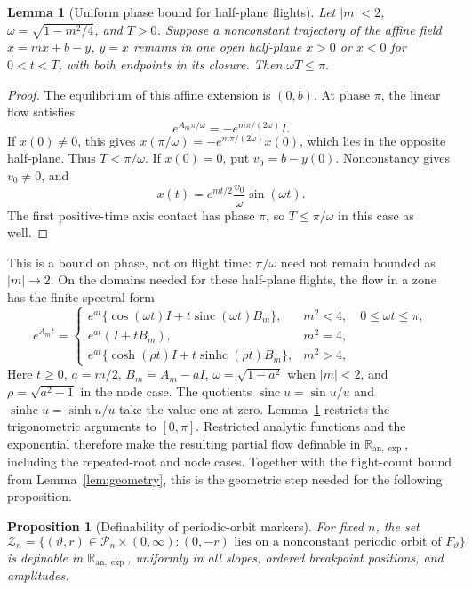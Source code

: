 \documentclass[11pt]{article}
\newtheorem{proposition}[theorem]{Proposition}
\newtheorem{lemma}[theorem]{Lemma}
\theoremstyle{remark}
\newcommand{\Ranexp}{\mathbb R_{\mathrm{an},\exp}}
\newcommand{\sinc}{\operatorname{sinc}}
\newcommand{\sinhc}{\operatorname{sinhc}}
\begin{document}
\begin{lemma}[Uniform phase bound for half-plane flights]
\label{lem:phase-bound}
Let \(|m|<2\), \(\omega=\sqrt{1-m^2/4}\), and \(T>0\).
Suppose a nonconstant trajectory of the affine field
\(\dot x=mx+b-y\), \(\dot y=x\) remains in one open half-plane
\(x>0\) or \(x<0\) for \(0<t<T\), with both endpoints in its
closure.  Then \(\omega T\le\pi\).
\end{lemma}
\begin{proof}
The equilibrium of this affine extension is \((0,b)\).  At phase
\(\pi\), the linear flow satisfies
\[
 e^{A_m\pi/\omega}=-e^{m\pi/(2\omega)}I.
\]
If \(x(0)\ne0\), this gives
\(x(\pi/\omega)=-e^{m\pi/(2\omega)}x(0)\), which lies in the
opposite half-plane.  Thus \(T<\pi/\omega\).  If \(x(0)=0\), put
\(v_0=b-y(0)\).  Nonconstancy gives \(v_0\ne0\), and
\[
 x(t)=e^{mt/2}\frac{v_0}{\omega}\sin(\omega t).
\]
The first positive-time axis contact has phase \(\pi\), so
\(T\le\pi/\omega\) in this case as well.
\end{proof}

This is a bound on phase, not on flight time: \(\pi/\omega\) need
not remain bounded as \(|m|\to2\).  On the domains needed for these
half-plane flights, the flow in a zone has the finite spectral form
\begin{equation}\label{eq:all-flows}
e^{A_mt}=\begin{cases}
e^{at}\{\cos(\omega t)I+t\sinc(\omega t)B_m\},&m^2<4,\quad0\le\omega t\le\pi,\\
e^{at}(I+tB_m),&m^2=4,\\
e^{at}\{\cosh(\rho t)I+t\sinhc(\rho t)B_m\},&m^2>4,
\end{cases}
\end{equation}
Here \(t\ge0\), \(a=m/2\), \(B_m=A_m-aI\),
\(\omega=\sqrt{1-a^2}\) when \(|m|<2\), and
\(\rho=\sqrt{a^2-1}\) in the node case.  The quotients
\(\sinc u=\sin u/u\) and \(\sinhc u=\sinh u/u\) take the value one
at zero.  Lemma~\ref{lem:phase-bound} restricts the trigonometric
arguments to \([0,\pi]\).  Restricted analytic functions and the
exponential therefore make the resulting partial flow definable in
\(\Ranexp\), including the repeated-root and node cases.  Together
with the flight-count bound from Lemma~\ref{lem:geometry}, this is the
geometric step needed for the following proposition.

\begin{proposition}[Definability of periodic-orbit markers]
\label{prop:definable-markers}
For fixed \(n\), the set
\[
 \mathcal Z_n=\bigl\{(\vartheta,r)\in\mathcal P_n\times(0,\infty):
 (0,-r)\text{ lies on a nonconstant periodic orbit of }F_\vartheta\bigr\}
\]
is definable in \(\Ranexp\), uniformly in all slopes, ordered breakpoint
positions, and amplitudes.
\end{proposition}
\end{document}
